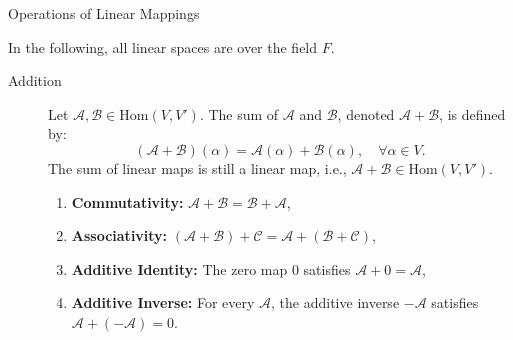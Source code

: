 \documentclass[11pt]{../../TexTemplate/elegantbook} %
\begin{document}
\begin{leftbarTitle}{Operations of Linear Mappings}\end{leftbarTitle}
In the following, all linear spaces are over the field \(F\).
\begin{description}
    \item[Addition] 
        Let \(\mathcal{A}, \mathcal{B} \in \mathrm{Hom}(V,V')\). 
        The sum of \(\mathcal{A}\) and \(\mathcal{B}\), denoted \(\mathcal{A+B}\), is defined by:
        \[
        (\mathcal{A+B})(\alpha) = \mathcal{A}(\alpha) + \mathcal{B}(\alpha), \quad \forall \alpha \in V.
        \]
        The sum of linear maps is still a linear map, i.e., \(\mathcal{A+B} \in \mathrm{Hom}(V,V')\).
        \begin{enumerate}
            \item \textbf{Commutativity:} \(\mathcal{A+B = B+A}\),
            \item \textbf{Associativity:} \(\mathcal{(A+B)+C = A+(B+C)}\),
            \item \textbf{Additive Identity:} The zero map \(\mathcal{0}\) satisfies \(\mathcal{A+0 = A}\),
            \item \textbf{Additive Inverse:} For every \(\mathcal{A}\), the additive inverse \(-\mathcal{A}\) 
                satisfies \(\mathcal{A+(-A) = 0}\).
        \end{enumerate}


\end{description}
\end{document}
